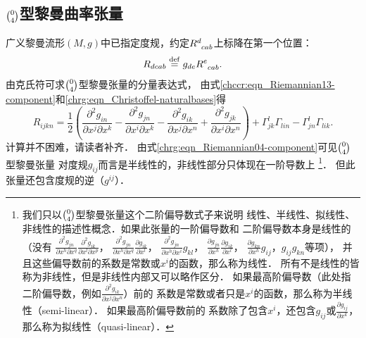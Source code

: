 \subsection{$\binom{0}{4}$型黎曼曲率张量}\label{chrg:sec_R04}

广义黎曼流形$(M,g)$中已指定度规，约定$R_{\hphantom{a} cab}^d$上标降在第一个位置：
\begin{equation}\label{chrg:eqn_RiemannianCurvature-d4}
    R_{dcab} \overset{\mathrm {def}}{=} g_{de}R_{\hphantom{a} cab}^e.
\end{equation}
由克氏符可求$\binom{0}{4}$型黎曼张量的分量表达式，
由式\eqref{chccr:eqn_Riemannian13-component}和\eqref{chrg:eqn_Christoffel-naturalbases}得
\begin{equation}\label{chrg:eqn_Riemannian04-component}
    R_{ijkn} =\frac{1}{2}\left(
           \frac{\partial^2 g_{in}} {\partial x^j\partial x^k}
         - \frac{\partial^2 g_{jn}} {\partial x^i\partial x^k}
         - \frac{\partial^2 g_{ik}} {\partial x^j\partial x^n}
         + \frac{\partial^2 g_{jk}} {\partial x^i\partial x^n} \right)
         + \Gamma_{jk}^l\Gamma _{lin} - \Gamma _{jn}^l\Gamma _{lik} .
\end{equation}  %
计算并不困难，请读者补齐．
由式\eqref{chrg:eqn_Riemannian04-component}可见$\binom{0}{4}$型黎曼张量
对度规$g_{ij}$而言是半线性的，非线性部分只体现在一阶导数上
{\footnote{我们只以$\binom{0}{4}$型黎曼张量这个二阶偏导数式子来说明
线性、半线性、拟线性、非线性的描述性概念．如果此张量的一阶偏导数和
二阶偏导数本身是线性的（没有
$\frac{\partial^2 g_{jn}} {\partial  x^h\partial  x^q}\frac{\partial^2 g_{ik}} {\partial  x^l\partial  x^p}$，
$\frac{\partial^2 g_{jn}} {\partial  x^h\partial  x^q}\frac{\partial g_{ik}} {\partial  x^l}$，
$\frac{\partial^2 g_{jn}} {\partial  x^h\partial  x^i}g_{kl}$，
$\frac{\partial g_{jn}} {\partial  x^h}\frac{\partial g_{ik}} {\partial  x^l}$，
$\frac{\partial g_{kn}} {\partial  x^h}g_{ij}$，$g_{ij}g_{kn}$等项），
并且这些偏导数前的系数是常数或$x^i$的函数，那么称为线性．
所有不是线性的皆称为非线性，但是非线性内部又可以略作区分．
如果最高阶偏导数（此处指二阶偏导数，例如$\frac{\partial^2 g_{ik}}{\partial x^j\partial x^n} $）前的
系数是常数或者只是$x^i$的函数，那么称为半线性（semi-linear）．
如果最高阶偏导数前的
系数除了包含$x^i$，还包含$g_{ij}$或$\frac{\partial g_{ij}} {\partial  x^k}$，
那么称为拟线性（quasi-linear）．}}．
但此张量还包含度规的逆（$g^{ij}$）．




